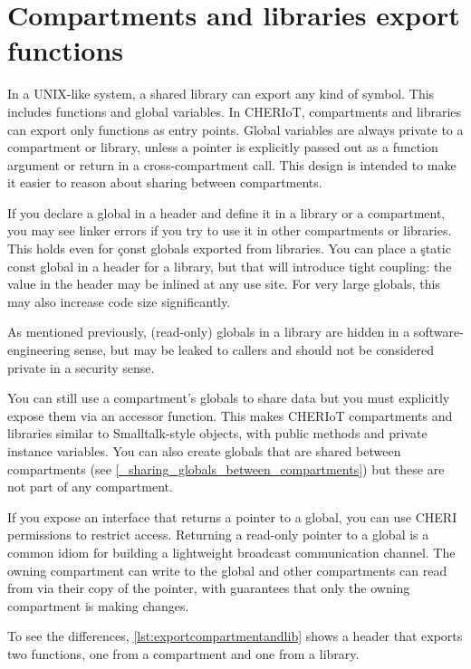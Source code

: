 \section{Compartments and libraries export functions}

In a UNIX-like system, a shared library can export any kind of symbol.
This includes functions and global variables.
In CHERIoT, compartments and libraries can export only functions as entry points.
Global variables are always private to a compartment or library, unless a pointer is explicitly passed out as a function argument or return in a cross-compartment call.
This design is intended to make it easier to reason about sharing between compartments.

If you declare a global in a header and define it in a library or a compartment, you may see linker errors if you try to use it in other compartments or libraries.
This holds even for \c{const} globals exported from libraries.
You can place a \c{static const} global in a header for a library, but that will introduce tight coupling: the value in the header may be inlined at any use site.
For very large globals, this may also increase code size significantly.

\begin{note}
As mentioned previously, (read-only) globals in a library are hidden in a software-engineering sense, but may be leaked to callers and should not be considered private in a security sense.
\end{note}

You can still use a compartment's globals to share data but you must explicitly expose them via an accessor function.
This makes CHERIoT compartments and libraries similar to Smalltalk-style objects, with public methods and private instance variables.
You can also create globals that are shared between compartments (see \ref{_sharing_globals_between_compartments}) but these are not part of any compartment.

If you expose an interface that returns a pointer to a global, you can use CHERI permissions to restrict access.
Returning a read-only pointer to a global is a common idiom for building a lightweight broadcast communication channel.
The owning compartment can write to the global and other compartments can read from via their copy of the pointer, with guarantees that only the owning compartment is making changes.

To see the differences, \ref{lst:exportcompartmentandlib} shows a header that exports two functions, one from a compartment and one from a library.

